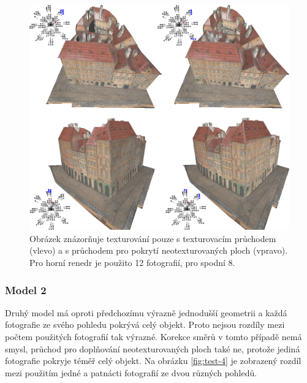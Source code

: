 \documentclass[11pt,twoside,a4paper]{book}
\begin{document}
\begin{figure}[h!]
\begin{center}
\includegraphics[width=\textwidth]{figures/test-3}
\caption{Obrázek znázorňuje texturování pouze s texturovacím průchodem (vlevo) a s průchodem pro pokrytí neotexturovaných ploch (vpravo). Pro horní renedr je použito 12 fotografií, pro spodní 8.}
\label{fig:test-3}
\end{center}
\end{figure}

\subsubsection*{Model 2}

Druhý model má oproti předchozímu výrazně jednodušší geometrii a každá fotografie ze svého pohledu pokrývá celý objekt. Proto nejsou rozdíly mezi počtem použitých fotografií tak výrazné. Korekce směrů v tomto případě nemá smysl, průchod pro doplňování neotexturovaných ploch také ne, protože jediná fotografie pokryje téměř celý objekt. Na obrázku \ref{fig:test-4} je zobrazený rozdíl mezi použitím jedné a patnácti fotografií ze dvou různých pohledů.
\end{document}
